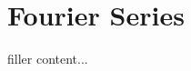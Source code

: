 \documentclass[../../templates/section]{subfiles}
\begin{document}
\section{Fourier Series}\label{sec:fourier-series}

filler content...
\end{document}
